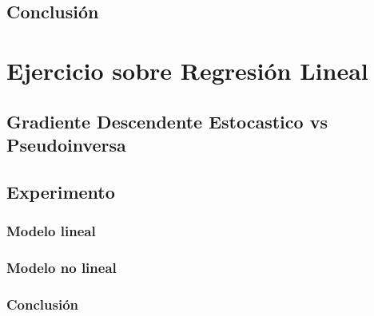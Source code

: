 \section{Conclusión}

\chapter{Ejercicio sobre Regresión Lineal}

\section{Gradiente Descendente Estocastico vs Pseudoinversa}

\section{Experimento}
\subsection{Modelo lineal}

\subsection{Modelo no lineal}

\subsection{Conclusión}
